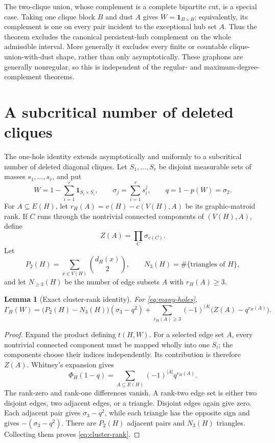 \documentclass[11pt]{article}
\newtheorem{lemma}[theorem]{Lemma}
\newcommand{\Gap}{\Gamma_H}
\begin{document}
The two-clique union, whose complement is a complete bipartite cut, is a
special case.  Taking one clique block $B$ and dust $A$ gives
$W=\mathbf1_{B\times B}$; equivalently, its complement is one on every pair
incident to the exceptional hub set $A$.  Thus the theorem excludes the
canonical persistent-hub complement on the whole admissible interval.  More
generally it excludes every finite or countable clique-union-with-dust shape,
rather than only asymptotically.  These graphons are generally nonregular, so
this is independent of the regular- and maximum-degree-complement theorems.

\section{A subcritical number of deleted cliques}

The one-hole identity extends asymptotically and uniformly to a subcritical
number of deleted diagonal cliques.  Let $S_1,\ldots,S_r$ be disjoint
measurable sets of masses $s_1,\ldots,s_r$, and put
\[
 W=1-\sum_{i=1}^r\mathbf 1_{S_i\times S_i},
 \qquad \sigma_j=\sum_{i=1}^r s_i^j,
 \qquad q=1-p(W)=\sigma_2.
 \tag{4.1}\label{eq:many-holes}
\]
For $A\subseteq E(H)$, let $r_H(A)=v(H)-c(V(H),A)$ be its graphic-matroid
rank.  If $C$ runs through the nontrivial connected components of $(V(H),A)$,
define
\[
 Z(A)=\prod_C\sigma_{v(C)}.
\]
Let
\[
 P_2(H)=\sum_{x\in V(H)}\binom{d_H(x)}2,
 \qquad N_3(H)=\#\{\text{triangles of }H\},
\]
and let $N_{\geq3}(H)$ be the number of edge subsets $A$ with
$r_H(A)\geq3$.

\begin{lemma}[Exact cluster-rank identity]\label{lem:cluster-rank}
For \eqref{eq:many-holes},
\begin{equation}
 \Gap(W)=
 \bigl(P_2(H)-N_3(H)\bigr)(\sigma_3-q^2)
 +\sum_{r_H(A)\geq3}(-1)^{|A|}
 \bigl(Z(A)-q^{r_H(A)}\bigr).
 \label{eq:cluster-rank}
\end{equation}
\end{lemma}

\begin{proof}
Expand the product defining $t(H,W)$.  For a selected edge set $A$, every
nontrivial connected component must be mapped wholly into one $S_i$; the
components choose their indices independently.  Its contribution is
therefore $Z(A)$.  Whitney's expansion gives
\[
 \Phi_H(1-q)=\sum_{A\subseteq E(H)}(-1)^{|A|}q^{r_H(A)}.
\]
The rank-zero and rank-one differences vanish.  A rank-two edge set is
either two disjoint edges, two adjacent edges, or a triangle.  Disjoint
edges again give zero.  Each adjacent pair gives $\sigma_3-q^2$, while each
triangle has the opposite sign and gives $-(\sigma_3-q^2)$.  There are
$P_2(H)$ adjacent pairs and $N_3(H)$ triangles.  Collecting them proves
\eqref{eq:cluster-rank}.
\end{proof}
\end{document}
